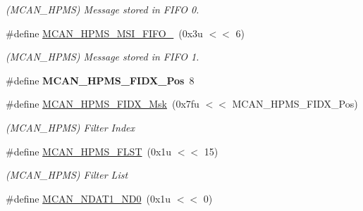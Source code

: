 \begin{DoxyCompactItemize}
\begin{DoxyCompactList}\small\item\em (M\+C\+A\+N\+\_\+\+H\+P\+MS) Message stored in F\+I\+FO 0. \end{DoxyCompactList}\item 
\mbox{\label{group__SAME70__MCAN_ga6f2b9b6c063a293b676d23ae4a4f2ecc}} 
\#define \mbox{\hyperlink{group__SAME70__MCAN_ga6f2b9b6c063a293b676d23ae4a4f2ecc}{M\+C\+A\+N\+\_\+\+H\+P\+M\+S\+\_\+\+M\+S\+I\+\_\+\+F\+I\+F\+O\+\_}}~(0x3u $<$$<$ 6)
\begin{DoxyCompactList}\small\item\em (M\+C\+A\+N\+\_\+\+H\+P\+MS) Message stored in F\+I\+FO 1. \end{DoxyCompactList}\item 
\mbox{\label{group__SAME70__MCAN_gaade58def638f4d1d3b8d122b4377f4ff}} 
\#define {\bfseries M\+C\+A\+N\+\_\+\+H\+P\+M\+S\+\_\+\+F\+I\+D\+X\+\_\+\+Pos}~8
\item 
\mbox{\label{group__SAME70__MCAN_gac4cda0bf7ea519c36442c211d6b4edcb}} 
\#define \mbox{\hyperlink{group__SAME70__MCAN_gac4cda0bf7ea519c36442c211d6b4edcb}{M\+C\+A\+N\+\_\+\+H\+P\+M\+S\+\_\+\+F\+I\+D\+X\+\_\+\+Msk}}~(0x7fu $<$$<$ M\+C\+A\+N\+\_\+\+H\+P\+M\+S\+\_\+\+F\+I\+D\+X\+\_\+\+Pos)
\begin{DoxyCompactList}\small\item\em (M\+C\+A\+N\+\_\+\+H\+P\+MS) Filter Index \end{DoxyCompactList}\item 
\mbox{\label{group__SAME70__MCAN_ga949a7f4be2724a48cbd47a5aba3f0ec2}} 
\#define \mbox{\hyperlink{group__SAME70__MCAN_ga949a7f4be2724a48cbd47a5aba3f0ec2}{M\+C\+A\+N\+\_\+\+H\+P\+M\+S\+\_\+\+F\+L\+ST}}~(0x1u $<$$<$ 15)
\begin{DoxyCompactList}\small\item\em (M\+C\+A\+N\+\_\+\+H\+P\+MS) Filter List \end{DoxyCompactList}\item 
\mbox{\label{group__SAME70__MCAN_ga4f46c691b52d8e61734302438436b06a}} 
\#define \mbox{\hyperlink{group__SAME70__MCAN_ga4f46c691b52d8e61734302438436b06a}{M\+C\+A\+N\+\_\+\+N\+D\+A\+T1\+\_\+\+N\+D0}}~(0x1u $<$$<$ 0)

\end{DoxyCompactItemize}
